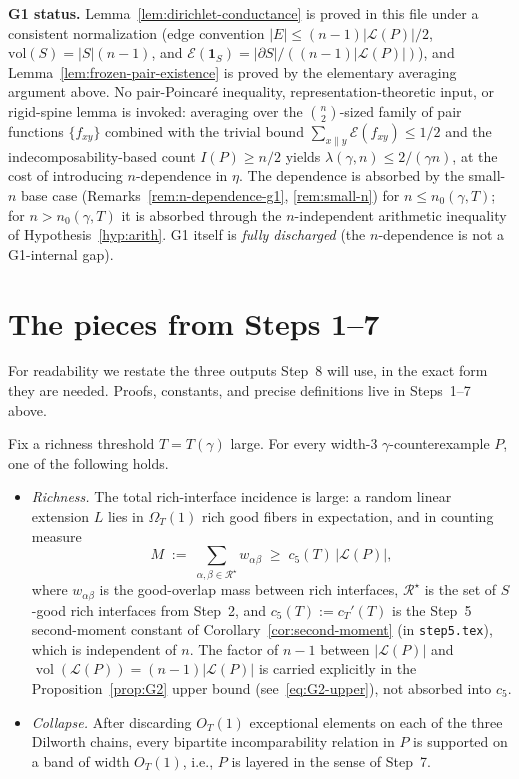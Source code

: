 \textbf{G1 status.}
Lemma~\ref{lem:dirichlet-conductance} is proved in this file under a
consistent normalization (edge convention
$|E| \le (n-1)|\mathcal L(P)|/2$, $\mathrm{vol}(S) = |S|(n-1)$, and
$\mathcal E(\mathbf 1_S) = |\partial S|/((n-1)|\mathcal L(P)|)$), and
Lemma~\ref{lem:frozen-pair-existence} is proved by the elementary
averaging argument above. No pair-Poincar\'e inequality,
representation-theoretic input, or rigid-spine lemma is invoked:
averaging over the $\binom{n}{2}$-sized family of pair functions
$\{f_{xy}\}$ combined with the trivial bound
$\sum_{x \parallel y} \mathcal E(f_{xy}) \le 1/2$ and the
indecomposability-based count $I(P) \ge n/2$ yields
$\lambda(\gamma, n) \le 2/(\gamma n)$, at the cost of introducing
$n$-dependence in $\eta$. The dependence is absorbed by the small-$n$
base case (Remarks~\ref{rem:n-dependence-g1}, \ref{rem:small-n})
for $n \le n_0(\gamma, T)$; for $n > n_0(\gamma, T)$ it is absorbed
through the $n$-independent arithmetic inequality of
Hypothesis~\ref{hyp:arith}. G1 itself is \emph{fully discharged}
(the $n$-dependence is not a G1-internal gap).

\section{The pieces from Steps 1--7}

For readability we restate the three outputs Step~8 will use, in the
exact form they are needed. Proofs, constants, and precise definitions
live in Steps~1--7 above.

\begin{proposition}\label{prop:step5}
Fix a richness threshold $T = T(\gamma)$ large. For every width-$3$
$\gamma$-counterexample $P$, one of the following holds.
\begin{itemize}[nosep]
 \item[(R)] \emph{Richness.} The total rich-interface incidence is
 large: a random linear extension $L$ lies in $\Omega_T(1)$ rich good
 fibers in expectation, and in counting measure
 \[
   M \;:=\; \sum_{\alpha,\beta \in \mathcal{R}^\star} w_{\alpha\beta}
   \;\ge\; c_5(T)\,|\mathcal L(P)|,
 \]
 where $w_{\alpha\beta}$ is the good-overlap mass between rich
 interfaces, $\mathcal R^\star$ is the set of $S$-good rich interfaces
 from Step~2, and $c_5(T) := c_T'(T)$ is the Step~5 second-moment
 constant of Corollary~\ref{cor:second-moment} (in
 \texttt{step5.tex}), which is independent of $n$. The factor of
 $n-1$ between $|\mathcal L(P)|$ and $\operatorname{vol}(\mathcal
 L(P)) = (n-1)|\mathcal L(P)|$ is carried explicitly in the
 Proposition~\ref{prop:G2} upper bound (see~\eqref{eq:G2-upper}),
 not absorbed into $c_5$.
 \item[(C)] \emph{Collapse.} After discarding $O_T(1)$ exceptional
 elements on each of the three Dilworth chains, every bipartite
 incomparability relation in $P$ is supported on a band of width
 $O_T(1)$, i.e., $P$ is layered in the sense of Step~7.
\end{itemize}
\end{proposition}

